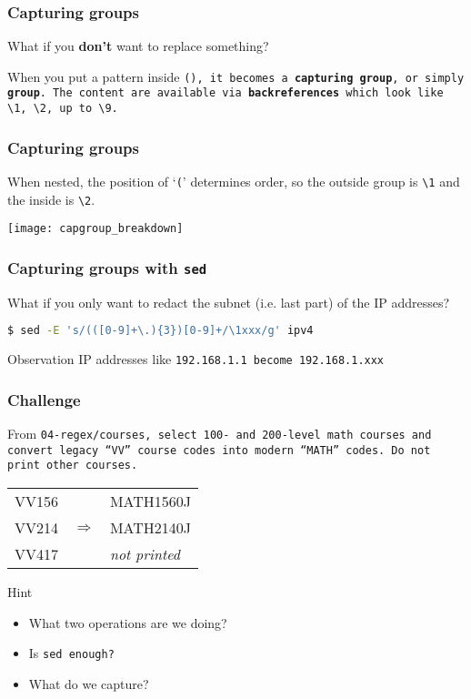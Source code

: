 \begin{frame}[fragile]
\frametitle{Capturing groups}
What if you \textbf{don't} want to replace something?
\bigskip

When you put a pattern inside \tt{()}, it becomes a \textbf{capturing group},
or simply \textbf{group}.
The content are available via \textbf{backreferences} which look like
\verb|\1|, \verb|\2|, up to \verb|\9|.
\end{frame}

\begin{frame}[fragile]
\frametitle{Capturing groups}
When nested, the position of `\verb|(|' determines order, so the outside group
is \verb|\1| and the inside is \verb|\2|.
\bigskip

\texttt{[image: capgroup\_breakdown]}
\end{frame}

\begin{frame}[fragile]
\frametitle{Capturing groups with \tt{sed}}
What if you only want to redact the subnet (i.e. last part) of the IP addresses?
\begin{lstlisting}[language=bash]
$ sed -E 's/(([0-9]+\.){3})[0-9]+/\1xxx/g' ipv4
\end{lstlisting}
\begin{block}{Observation}
    IP addresses like \tt{192.168.1.1} become \tt{192.168.1.xxx}
\end{block}
\end{frame}

\begin{frame}[fragile]
\frametitle{Challenge}
From \tt{04-regex/courses}, select 100- and 200-level math courses and convert
legacy ``VV'' course codes into modern ``MATH'' codes.
Do not print other courses.
\begin{example}
    \begin{tabular}{lcl}
        VV156 & & MATH1560J \\
        VV214 & $\Longrightarrow$ & MATH2140J \\
        VV417 & & \textit{not printed}
    \end{tabular}
\end{example}
\pause
\begin{block}{Hint}
    \begin{itemize}
        \item What two operations are we doing?
        \item Is \tt{sed} enough?
        \item What do we capture?
    \end{itemize}
\end{block}
\end{frame}

